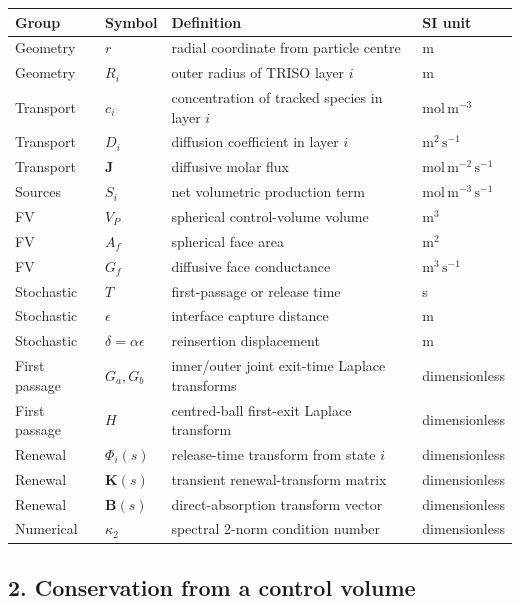 \documentclass[11pt,a4paper]{article}
\begin{document}
\begin{longtable}{p{} p{} p{} p{}}
Group & Symbol & Definition & SI unit \\
\hline
Geometry & $r$ & radial coordinate from particle centre & m \\
Geometry & $R_i$ & outer radius of TRISO layer $i$ & m \\
Transport & $c_i$ & concentration of tracked species in layer $i$ & $\mathrm{mol\,m^{-3}}$ \\
Transport & $D_i$ & diffusion coefficient in layer $i$ & $\mathrm{m^2\,s^{-1}}$ \\
Transport & $\mathbf J$ & diffusive molar flux & $\mathrm{mol\,m^{-2}\,s^{-1}}$ \\
Sources & $S_i$ & net volumetric production term & $\mathrm{mol\,m^{-3}\,s^{-1}}$ \\
FV & $V_P$ & spherical control-volume volume & $\mathrm{m^3}$ \\
FV & $A_f$ & spherical face area & $\mathrm{m^2}$ \\
FV & $G_f$ & diffusive face conductance & $\mathrm{m^3\,s^{-1}}$ \\
Stochastic & $T$ & first-passage or release time & s \\
Stochastic & $\epsilon$ & interface capture distance & m \\
Stochastic & $\delta=\alpha\epsilon$ & reinsertion displacement & m \\
First passage & $G_a,G_b$ & inner/outer joint exit-time Laplace transforms & dimensionless \\
First passage & $H$ & centred-ball first-exit Laplace transform & dimensionless \\
Renewal & $\Phi_i(s)$ & release-time transform from state $i$ & dimensionless \\
Renewal & $\mathbf K(s)$ & transient renewal-transform matrix & dimensionless \\
Renewal & $\mathbf B(s)$ & direct-absorption transform vector & dimensionless \\
Numerical & $\kappa_2$ & spectral 2-norm condition number & dimensionless \\
\end{longtable}

\subsection*{2. Conservation from a control volume}
\end{document}
